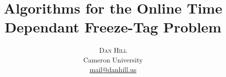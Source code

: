 \newcommand{\articletitle}{Algorithms for the Online Time Dependant Freeze-Tag Problem}
\newcommand{\name}{Dan Hill}
\newcommand{\university}{Cameron University}
\newcommand{\email}{mail@danhill.us}


\title{\vspace{-15mm}\fontsize{24pt}{10pt}\selectfont\textbf{\articletitle}} %

\author{\large\textsc{\name} \\[2mm] 		%
\normalsize \university \\		 			%
\normalsize \href{mailto:\email}{\email} 	%
\vspace{-5mm}}

\date{}